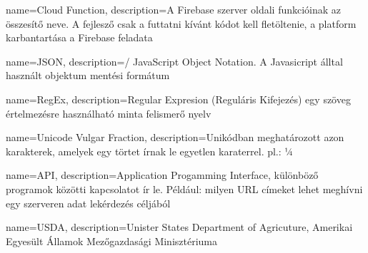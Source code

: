 {
        name=Cloud Function,
        description={A Firebase szerver oldali funkcióinak az összesítő neve. A fejlesző csak a futtatni kívánt kódot kell fletöltenie, a platform karbantartása a Firebase feladata}
}

{
        name=JSON,
        description={/ JavaScript Object Notation. A Javasicript álltal használt objektum mentési formátum}
}

{
        name=RegEx,
        description={Regular Expresion (Reguláris Kifejezés) egy szöveg értelmezésre használható minta felismerő nyelv}
}

{
        name=Unicode Vulgar Fraction,
        description={Unikódban meghatározott azon karakterek, amelyek egy törtet írnak le egyetlen karaterrel. pl.: ¼}
}


{
        name=API,
        description={Application Progamming Interface, különböző programok közötti kapcsolatot ír le. 
        Például: milyen URL címeket lehet meghívni egy szerveren adat lekérdezés céljából}
}

{
        name=USDA,
        description={Unister States Department of Agricuture, Amerikai Egyesült Államok Mezőgazdasági Minisztériuma}
}
